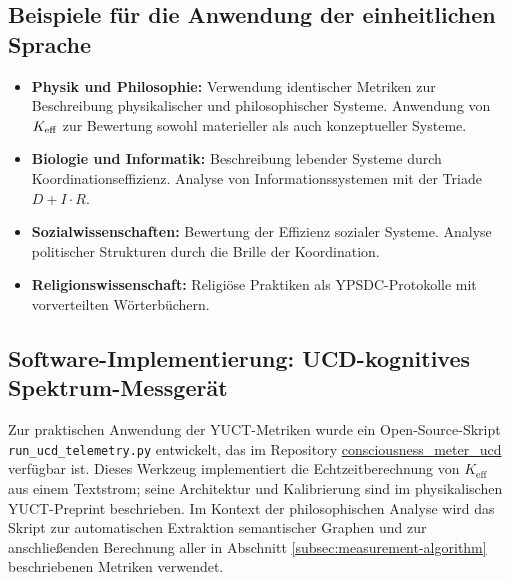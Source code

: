 \documentclass[12pt,a4paper]{article}
\begin{document}
	\subsection{Beispiele für die Anwendung der einheitlichen Sprache}
	
	\begin{itemize}
		\item \textbf{Physik und Philosophie:} Verwendung identischer Metriken zur Beschreibung physikalischer und philosophischer Systeme. Anwendung von \(\Keff\) zur Bewertung sowohl materieller als auch konzeptueller Systeme.
		\item \textbf{Biologie und Informatik:} Beschreibung lebender Systeme durch Koordinationseffizienz. Analyse von Informationssystemen mit der Triade \(D + I \cdot R\).
		\item \textbf{Sozialwissenschaften:} Bewertung der Effizienz sozialer Systeme. Analyse politischer Strukturen durch die Brille der Koordination.
		\item \textbf{Religionswissenschaft:} Religiöse Praktiken als YPSDC-Protokolle mit vorverteilten Wörterbüchern.
	\end{itemize}
	
	\subsection{Software-Implementierung: UCD-kognitives Spektrum-Messgerät}
	\label{subsec:ucd-software}
	
	Zur praktischen Anwendung der YUCT-Metriken wurde ein Open-Source-Skript \texttt{run\_ucd\_telemetry.py} entwickelt, das im Repository \href{https://github.com/Alexey-Yakushev-YUCT/consciousness_meter_ucd}{consciousness\_meter\_ucd} verfügbar ist. Dieses Werkzeug implementiert die Echtzeitberechnung von \(K_{\mathrm{eff}}\) aus einem Textstrom; seine Architektur und Kalibrierung sind im physikalischen YUCT-Preprint \cite{Yakushev2026b} beschrieben. Im Kontext der philosophischen Analyse wird das Skript zur automatischen Extraktion semantischer Graphen und zur anschließenden Berechnung aller in Abschnitt \ref{subsec:measurement-algorithm} beschriebenen Metriken verwendet.
	
	
\end{document}
